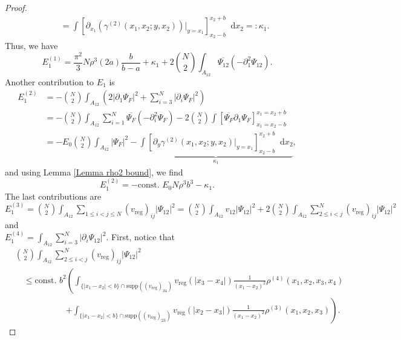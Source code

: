 \documentclass[a4paper,11pt]{article}
\newcommand{\supp}{\text{supp}}
\newcommand{\abs}[1]{\left\lvert #1 \right\rvert}
\newcommand*\diff{\mathop{}\!\mathrm{d}}
\numberwithin{equation}{section}
\begin{document}
\begin{proof}
\begin{equation}
\begin{aligned}
		&\quad=\int\left[\partial_{x_1}\left(\gamma^{(2)}(x_1,x_2;y,x_2)\right)\bigg\vert_{y=x_1}\right]_{x_2-b}^{x_2+b}\diff x_2=:\kappa_1.
		\end{aligned}
		\end{equation}
		Thus, we have \begin{equation}
		E_1^{(1)}=\frac{\pi^2}{3}N\rho^3 (2a)\frac{b}{b-a}+\kappa_1+2\binom{N}{2}\int_{A_{12}}\overline{\Psi_{12}}(-\partial^2_1\Psi_{12}).
		\end{equation}
		Another contribution to $ E_1 $ is \begin{equation}
		\begin{aligned}
		E_1^{(2)}&=-\binom{N}{2}\int_{A_{12}}\left(2\abs{\partial_1\Psi_F}^2+\sum_{i=3}^{N}\abs{\partial_i\Psi_F}^2\right)\\&=-\binom{N}{2}\int_{A_{12}}\sum_{i=1}^{N}\overline{\Psi_F}(-\partial^2_i\Psi_F)-2\binom{N}{2}\int\left[\overline{\Psi_F}\partial_1\Psi_F\right]_{x_1=x_2-b}^{x_1=x_2+b}\\
		&=-E_0\binom{N}{2}\int_{A_{12}}\abs{\Psi_F}^2-\underbrace{\int\left[\partial_y\gamma^{(2)}(x_1,x_2;y,x_2)\vert_{y=x_1}\right]_{x_2-b}^{x_2+b} \diff x_2}_{\kappa_1},
		\end{aligned}
		\end{equation}
		and using Lemma \ref{Lemma rho2 bound}, we find \begin{equation}
		E_1^{(2)}=-\text{const. }E_0 N\rho^3b^3-\kappa_1.
		\end{equation}
		The last contributions are\\ $ E^{(3)}_1=\binom{N}{2}\int_{A_{12}} \sum_{1\leq i<j\leq N}(v_{\text{reg}})_{ij}\abs{\Psi_{12}}^2=\binom{N}{2}\int_{A_{12}}v_{12}\abs{\Psi_{12}}^2+2\binom{N}{2}\int_{A_{12}} \sum_{2\leq i<j}^{N}(v_{\text{reg}})_{ij}\abs{\Psi_{12}}^2 $ and\\ $ E_1^{(4)}=\int_{A_{12}}\sum_{i=3}^{N}\abs{\partial_i\Psi_{12}}^2 $.
		First, notice that \begin{equation}
		\begin{aligned}
		&\binom{N}{2}\int_{A_{12}} \sum_{2\leq i<j}^{N}(v_{\text{reg}})_{ij}\abs{\Psi_{12}}^2\\&\quad\leq \text{const. }b^2 \left(\int_{\{\abs{x_1-x_2}<b\}\cap\supp((v_{\text{reg}})_{34})}v_{\text{reg}}(\abs{x_3-x_4})\frac{1}{(x_1-x_2)^2}\rho^{(4)}(x_1,x_2,x_3,x_4)\right.\\
		&\qquad\qquad\qquad\left.+\int_{\{\abs{x_1-x_2}<b\}\cap\supp((v_{\text{reg}})_{23})}v_{\text{reg}}(\abs{x_2-x_3})\frac{1}{(x_1-x_2)^2}\rho^{(3)}(x_1,x_2,x_3)\right).

\end{aligned}
\end{equation}
\end{proof}
\end{document}
